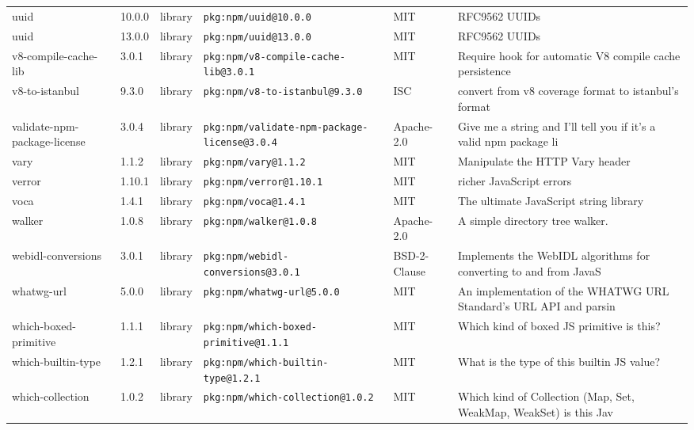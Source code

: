 \documentclass[11pt,a4paper]{article}
\begin{document}
\begin{longtable}{|p{4cm}|p{2cm}|p{1.6cm}|p{5cm}|p{1.5cm}|p{3.5cm}|}
\raggedright uuid & 10.0.0 & library & \small\texttt{pkg:npm/uuid@10.0.0} & MIT & \small RFC9562 UUIDs \\
\raggedright uuid & 13.0.0 & library & \small\texttt{pkg:npm/uuid@13.0.0} & MIT & \small RFC9562 UUIDs \\
\raggedright v8-compile-cache-lib & 3.0.1 & library & \small\texttt{pkg:npm/v8-compile-cache-lib@3.0.1} & MIT & \small Require hook for automatic V8 compile cache persistence \\
\raggedright v8-to-istanbul & 9.3.0 & library & \small\texttt{pkg:npm/v8-to-istanbul@9.3.0} & ISC & \small convert from v8 coverage format to istanbul's format \\
\raggedright validate-npm-package-license & 3.0.4 & library & \small\texttt{pkg:npm/validate-npm-package-license@3.0.4} & Apache-2.0 & \small Give me a string and I'll tell you if it's a valid npm package li \\
\raggedright vary & 1.1.2 & library & \small\texttt{pkg:npm/vary@1.1.2} & MIT & \small Manipulate the HTTP Vary header \\
\raggedright verror & 1.10.1 & library & \small\texttt{pkg:npm/verror@1.10.1} & MIT & \small richer JavaScript errors \\
\raggedright voca & 1.4.1 & library & \small\texttt{pkg:npm/voca@1.4.1} & MIT & \small The ultimate JavaScript string library \\
\raggedright walker & 1.0.8 & library & \small\texttt{pkg:npm/walker@1.0.8} & Apache-2.0 & \small A simple directory tree walker. \\
\raggedright webidl-conversions & 3.0.1 & library & \small\texttt{pkg:npm/webidl-conversions@3.0.1} & BSD-2-Clause & \small Implements the WebIDL algorithms for converting to and from JavaS \\
\raggedright whatwg-url & 5.0.0 & library & \small\texttt{pkg:npm/whatwg-url@5.0.0} & MIT & \small An implementation of the WHATWG URL Standard's URL API and parsin \\
\raggedright which-boxed-primitive & 1.1.1 & library & \small\texttt{pkg:npm/which-boxed-primitive@1.1.1} & MIT & \small Which kind of boxed JS primitive is this? \\
\raggedright which-builtin-type & 1.2.1 & library & \small\texttt{pkg:npm/which-builtin-type@1.2.1} & MIT & \small What is the type of this builtin JS value? \\
\raggedright which-collection & 1.0.2 & library & \small\texttt{pkg:npm/which-collection@1.0.2} & MIT & \small Which kind of Collection (Map, Set, WeakMap, WeakSet) is this Jav \\

\end{longtable}
\end{document}
